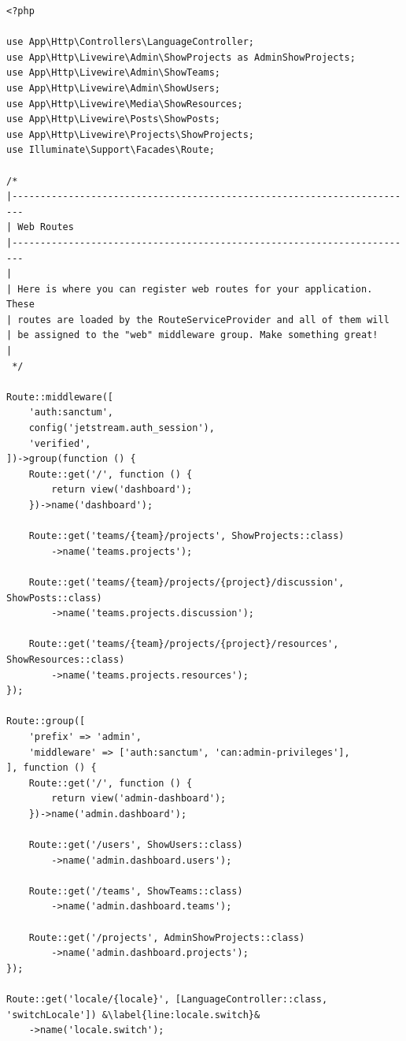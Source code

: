 \begin{lstlisting}[caption={Sadržaj datoteke \texttt{routes/web.php}}, label=routes, escapechar=&]
<?php

use App\Http\Controllers\LanguageController;
use App\Http\Livewire\Admin\ShowProjects as AdminShowProjects;
use App\Http\Livewire\Admin\ShowTeams;
use App\Http\Livewire\Admin\ShowUsers;
use App\Http\Livewire\Media\ShowResources;
use App\Http\Livewire\Posts\ShowPosts;
use App\Http\Livewire\Projects\ShowProjects;
use Illuminate\Support\Facades\Route;

/*
|------------------------------------------------------------------------
| Web Routes
|------------------------------------------------------------------------
|
| Here is where you can register web routes for your application. These
| routes are loaded by the RouteServiceProvider and all of them will
| be assigned to the "web" middleware group. Make something great!
|
 */

Route::middleware([
    'auth:sanctum',
    config('jetstream.auth_session'),
    'verified',
])->group(function () {
    Route::get('/', function () {
        return view('dashboard');
    })->name('dashboard');

    Route::get('teams/{team}/projects', ShowProjects::class)
        ->name('teams.projects');

    Route::get('teams/{team}/projects/{project}/discussion', ShowPosts::class)
        ->name('teams.projects.discussion');

    Route::get('teams/{team}/projects/{project}/resources', ShowResources::class)
        ->name('teams.projects.resources');
});

Route::group([
    'prefix' => 'admin',
    'middleware' => ['auth:sanctum', 'can:admin-privileges'],
], function () {
    Route::get('/', function () {
        return view('admin-dashboard');
    })->name('admin.dashboard');

    Route::get('/users', ShowUsers::class)
        ->name('admin.dashboard.users');

    Route::get('/teams', ShowTeams::class)
        ->name('admin.dashboard.teams');

    Route::get('/projects', AdminShowProjects::class)
        ->name('admin.dashboard.projects');
});

Route::get('locale/{locale}', [LanguageController::class, 'switchLocale']) &\label{line:locale.switch}&
    ->name('locale.switch');

\end{lstlisting}


